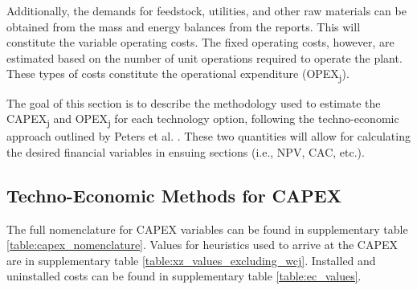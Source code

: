 \documentclass{article}
\begin{document}
Additionally, the demands for feedstock, utilities, and other raw materials can be obtained from the mass and energy balances from the reports. This will constitute the variable operating costs. The fixed operating costs, however, are estimated based on the number of unit operations required to operate the plant. These types of costs constitute the operational expenditure (OPEX\textsubscript{j}).

The goal of this section is to describe the methodology used to estimate the CAPEX\textsubscript{j} and OPEX\textsubscript{j} for each technology option, following the techno-economic approach outlined by Peters et al. \cite{Peters2003}. These two quantities will allow for calculating the desired financial variables in ensuing sections (i.e., NPV, CAC, etc.).

\subsection{Techno-Economic Methods for CAPEX}



The full nomenclature for CAPEX variables can be found in supplementary table \ref{table:capex_nomenclature}. Values for heuristics used to arrive at the CAPEX are in supplementary table \ref{table:xz_values_excluding_wcj}. Installed and uninstalled costs can be found in supplementary table \ref{table:ec_values}.
\end{document}
